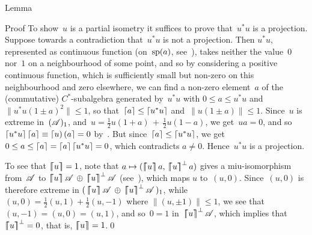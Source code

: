 \documentclass[a]{subfiles}
\begin{document}
\begin{parsec}
\begin{point}{Lemma}
\begin{point}{Proof}
To show~$u$ is a partial isometry
it suffices to prove that~$u^*u$ is a projection.
Suppose towards a contradiction that~$u^*u$ is not a projection.
Then $u^*u$,
represented
as continuous function (on~$\mathrm{sp}(a)$, see~\TODO{}),
takes neither the value~$0$ nor~$1$ on a neighbourhood
of some point,
and so by considering a
positive continuous function,
which is sufficiently small but non-zero on this neighbourhood
and zero elsewhere, 
we can find a non-zero element~$a$ 
of the (commutative) $C^*$-subalgebra generated by~$u^*u$
with $0\leq a\leq u^*u$
and $\|u^*u (1\pm a)^2\|\leq 1$,
so that~$\left\lceil a\right\rceil\leq \left\lceil u^*u\right\rceil$ and~$\|u(1\pm a)\|\leq 1$.
Since~$u$ is extreme in~$(\mathscr{A})_1$,
and~$u=\frac{1}{2}u(1+a)\,+\,\frac{1}{2}u(1-a)$,
we get~$ua=0$,
and so $\left\lceil u^*u\right\rceil\left\lceil a\right\rceil \equiv 
\left\lceil u\right)\left(a\right\rceil=0$ by~\TODO{}.
But since~$\left\lceil a\right\rceil\leq \left\lceil u^*u\right\rceil$,
we get $0\leq a\leq \left\lceil a\right\rceil=\left\lceil a\right\rceil\left\lceil u^*u\right\rceil=0$,
which contradicts $a\neq 0$.
Hence~$u^*u$ is a projection.

To see that $\left\lceil\!\!\left\lceil u\right\rceil\!\!\right\rceil=1$,
note that
$a\mapsto (\cceil{u}a,\, \cceil{u}^\perp a)$
gives a miu-isomorphism
from~$\mathscr{A}$ to $\cceil{u}\scrA \,\oplus\,\cceil{u}^\perp \scrA$
(see~\TODO{}),
which maps $u$ to~$(u,0)$.
Since~$(u,0)$ is therefore extreme in 
$(\,\cceil{u}\scrA\,\oplus\,\cceil{u}^\perp\scrA\,)_1$,
while~$(u,0)=\frac{1}{2}(u,1)+\frac{1}{2}(u,-1)$
where  $\|(u,\pm 1)\|\leq 1$,
we see that~$(u,-1)=(u,0)=(u,1)$,
and so~$0=1$ in~$\left\lceil\!\!\left\lceil u\right\rceil\!\!\right\rceil^\perp\mathscr{A}$,
which implies that~$\left\lceil\!\!\left\lceil u\right\rceil\!\!\right\rceil^\perp=0$,
that is,  $\left\lceil\!\!\left\lceil u\right\rceil\!\!\right\rceil=1$.\qed
\end{point}
\end{point}
\end{parsec}




\end{document}
